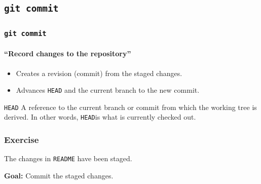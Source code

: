 \documentclass{beamer}
\newcommand\gitcmd[1]{\texttt{git #1}}
\newcommand\gHEAD{\texttt{HEAD}}
\newcommand\goal[1]{\textbf{Goal:} #1}
\begin{document}
\subsection{\gitcmd{commit}}

\begin{frame}
  \frametitle{\gitcmd{commit}}
  \framesubtitle{``Record changes to the repository''}
  \begin{itemize}
    \item Creates a revision (commit) from the staged changes.
    \item Advances \gHEAD{} and the current branch to the new commit.
  \end{itemize}
  \vfill
  \begin{block}{\gHEAD{}}
    A reference to the current branch or commit from which the working tree is derived. In other words, \gHEAD is what is currently checked out.
  \end{block}
\end{frame}

\begin{frame}
  \frametitle{Exercise}
  The changes in \texttt{README} have been staged.

  \goal{Commit the staged changes.}

  \begin{figure}
    \centering
  \end{figure}
\end{frame}
\end{document}
